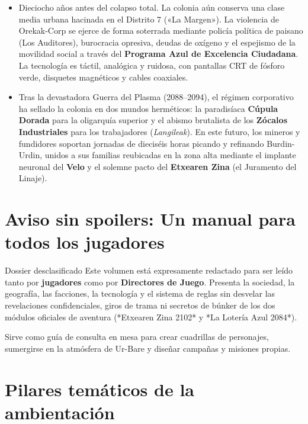 \begin{itemize}
  \item {}  
  Dieciocho años antes del colapso total. La colonia aún conserva una clase media urbana hacinada en el Distrito 7 («La Margen»). La violencia de Orekak-Corp se ejerce de forma soterrada mediante policía política de paisano (Los Auditores), burocracia opresiva, deudas de oxígeno y el espejismo de la movilidad social a través del \textbf{Programa Azul de Excelencia Ciudadana}. La tecnología es táctil, analógica y ruidosa, con pantallas CRT de fósforo verde, disquetes magnéticos y cables coaxiales.
  
  \item {}  
  Tras la devastadora Guerra del Plasma (2088--2094), el régimen corporativo ha sellado la colonia en dos mundos herméticos: la paradisíaca \textbf{Cúpula Dorada} para la oligarquía superior y el abismo brutalista de los \textbf{Zócalos Industriales} para los trabajadores (\emph{Langileak}). En este futuro, los mineros y fundidores soportan jornadas de dieciséis horas picando y refinando Burdin-Urdin, unidos a sus familias reubicadas en la zona alta mediante el implante neuronal del \textbf{Velo} y el solemne pacto del \textbf{Etxearen Zina} (el Juramento del Linaje).
\end{itemize}

\section{Aviso sin spoilers: Un manual para todos los jugadores}

\begin{CajaAmbientacion}{Dossier desclasificado}
Este volumen está expresamente redactado para ser leído tanto por \textbf{jugadores} como por \textbf{Directores de Juego}. Presenta la sociedad, la geografía, las facciones, la tecnología y el sistema de reglas sin desvelar las revelaciones confidenciales, giros de trama ni secretos de búnker de los dos módulos oficiales de aventura (*Etxearen Zina 2102* y *La Lotería Azul 2084*). 

Sirve como guía de consulta en mesa para crear cuadrillas de personajes, sumergirse en la atmósfera de Ur-Bare y diseñar campañas y misiones propias.
\end{CajaAmbientacion}

\section{Pilares temáticos de la ambientación}


